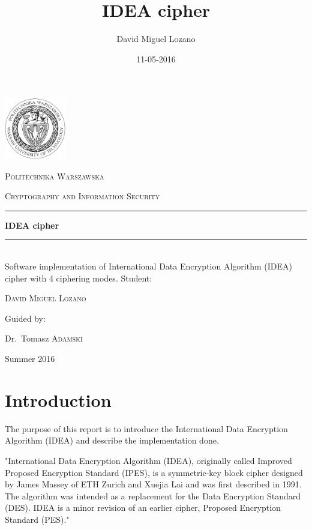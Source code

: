 \documentclass[a4paper,12pt,titlepage]{article}
\newcommand{\HRule}[1]{\rule{\linewidth}{#1}}
\begin{document}
\author{David Miguel Lozano}
\title{IDEA cipher}
\date{11-05-2016}

\begin{titlepage}
	\centering
	\includegraphics[width=0.2\textwidth]{images/pw-logo.png}\par
	\vspace{0.3cm}
	{\scshape\LARGE Politechnika Warszawska \par}
	\vfill
	{\scshape\Large Cryptography and Information Security \par}
	\HRule{2pt}
	{\huge\bfseries IDEA cipher \par}
	\HRule{2pt}
	\\ [0.5cm]
	{Software implementation of International Data Encryption Algorithm (IDEA) cipher with 4 ciphering modes.}
	\vfill
	Student:\par
	{\Large\scshape David Miguel Lozano \par}
	\vfill
	Guided by:\par
	Dr.~Tomasz \textsc{Adamski}
	\vfill
	{\large Summer 2016 \par}
\end{titlepage}

\newpage
\tableofcontents
\begin{appendix}
  \listoffigures
\end{appendix}

\newpage

\section{Introduction}

The purpose of this report is to introduce the International Data Encryption Algorithm (IDEA) and describe the implementation done.

"International Data Encryption Algorithm (IDEA), originally called Improved Proposed Encryption Standard (IPES), is a symmetric-key block cipher designed by James Massey of ETH Zurich and Xuejia Lai and was first described in 1991. The algorithm was intended as a replacement for the Data Encryption Standard (DES). IDEA is a minor revision of an earlier cipher, Proposed Encryption Standard (PES)."  \citep{wiki:idea}
\end{document}
